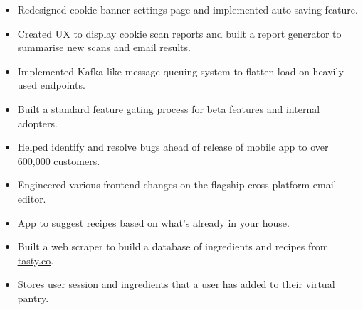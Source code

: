 \documentclass[10pt,a4paper,ragged2e]{altacv}
\begin{document}

\begin{fullwidth}
\makecvheader
\end{fullwidth}



\begin{itemize}
\item Redesigned cookie banner settings page and implemented auto-saving feature.
\smallskip
\item Created UX to display cookie scan reports and built a report generator to summarise new scans and email results.
\smallskip
\item Implemented Kafka-like message queuing system to flatten load on heavily used endpoints.
\end{itemize}

\divider

\begin{itemize}
\item Built a standard feature gating process for beta features and internal adopters.
\smallskip
\item Helped identify and resolve bugs ahead of release of mobile app to over 600,000 customers.
\smallskip
\item Engineered various frontend changes on the flagship cross platform email editor.
\end{itemize}


\begin{itemize}
\item App to suggest recipes based on what's already in your house.
\smallbreak
\item Built a web scraper to build a database of ingredients and recipes from \href{https://tasty.co/}{\underline{tasty.co}}.
\smallskip
\item Stores user session and ingredients that a user has added to their virtual pantry.
\end{itemize}
\end{document}
